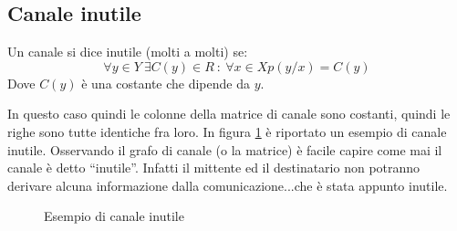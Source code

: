 \subsection{Canale inutile}

\medskip

\begin{definizione}
 Un canale si dice inutile (molti a molti) se:
 \[
  \forall y \in Y \ \exists C(y) \in R \ : \ \forall x \in X p(y/x)=C(y)
 \]
 Dove $C(y)$ è una costante che dipende da $y$.
\end{definizione}

In questo caso quindi le colonne della matrice di canale sono costanti, quindi le righe sono tutte identiche fra loro.
In figura \ref{fig:inutile} è riportato un esempio di canale inutile. Osservando il grafo di canale (o la matrice) è facile capire
come mai il canale è detto ``inutile''. Infatti il mittente ed il destinatario non potranno derivare alcuna informazione dalla 
comunicazione...che è stata appunto inutile.

\begin{figure}[htbp]
  \centering
  \hspace{1cm}
  \caption{Esempio di canale inutile}
  \label{fig:inutile}
\end{figure}

